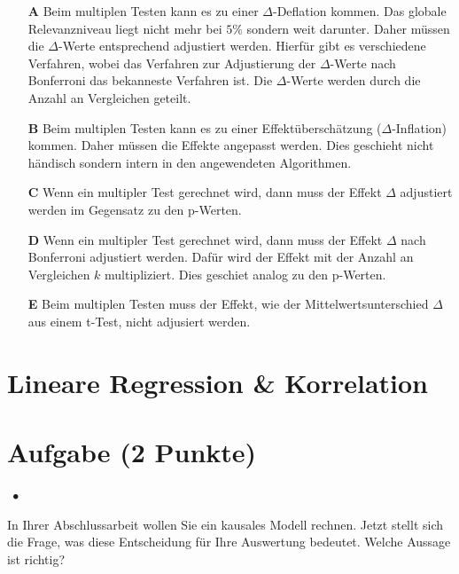 \documentclass[a4paper, 9pt]{scrartcl}\usepackage[]{graphicx}\usepackage[]{xcolor}
\begin{document}
\begin{enumerate}
\item [\textbf{A} \msquare] Beim multiplen Testen kann es zu einer $\Delta$-Deflation kommen. Das globale Relevanzniveau liegt nicht mehr bei $5\%$ sondern weit darunter. Daher müssen die $\Delta$-Werte entsprechend adjustiert werden. Hierfür gibt es verschiedene Verfahren, wobei das Verfahren zur Adjustierung der $\Delta$-Werte nach Bonferroni das bekanneste Verfahren ist. Die $\Delta$-Werte werden durch die Anzahl an Vergleichen geteilt.
\item [\textbf{B} \msquare] Beim multiplen Testen kann es zu einer Effektüberschätzung ($\Delta$-Inflation) kommen. Daher müssen die Effekte angepasst werden. Dies geschieht nicht händisch sondern intern in den angewendeten Algorithmen.
\item [\textbf{C} \msquare] Wenn ein multipler Test gerechnet wird, dann muss der Effekt $\Delta$ adjustiert werden im Gegensatz zu den p-Werten.
\item [\textbf{D} \msquare] Wenn ein multipler Test gerechnet wird, dann muss der Effekt $\Delta$ nach Bonferroni adjustiert werden. Dafür wird der Effekt mit der Anzahl an Vergleichen $k$ multipliziert. Dies geschiet analog zu den p-Werten.
\item [\textbf{E} \msquare] Beim multiplen Testen muss der Effekt, wie der Mittelwertsunterschied $\Delta$ aus einem t-Test, nicht adjusiert werden.
\end{enumerate}
\section*{Lineare Regression \& Korrelation}

\section{Aufgabe \hfill (2 Punkte)}

\ifcollection
\begin{flushright}
\tiny\vspace{-2Ex}
\textbf{\examinhaltstart}
\exammodulestatversuch $\;\bullet$
\exammodulebiostat
\vspace{-1Ex}
\end{flushright}
\fi




In Ihrer Abschlussarbeit wollen Sie ein kausales Modell rechnen. Jetzt stellt sich die Frage, was diese Entscheidung für Ihre Auswertung bedeutet. Welche Aussage ist richtig?
\end{document}
